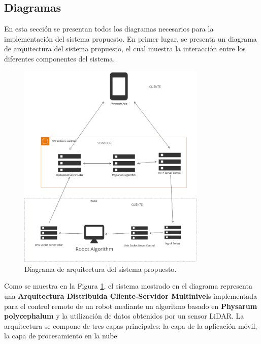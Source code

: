 \clearpage
\subsection{Diagramas} %
\label{sub:Diagramas}


        En esta secci\'on se presentan todos los diagramas necesarios para la implementaci\'on del sistema propuesto.
        En primer lugar, se presenta un diagrama de arquitectura del sistema propuesto, el cual muestra la interacci\'on 
        entre los diferentes componentes del sistema. 
        \vskip 0.5cm
            \begin{figure}[htbp]
                \centering
                \includegraphics[width=0.8\textwidth]{images/desarrollo/diagramas/ArquitecturaSistema.png}
                \caption{Diagrama de arquitectura del sistema propuesto.}
                \label{fig:ArquitecturaSistema}
            \end{figure}
        \vskip 0.5cm
        Como se muestra en la Figura \ref{fig:ArquitecturaSistema}, el sistema mostrado en el diagrama representa una \textbf{Arquitectura Distribuida Cliente-Servidor Multinivel}s implementada para el control remoto 
        de un robot mediante un algoritmo basado en \textbf{Physarum polycephalum} y la utilizaci\'on de datos obtenidos por un sensor LiDAR. 
        La arquitectura se compone de tres capas principales: la capa de la aplicaci\'on m\'ovil, la capa de procesamiento en la nube 

